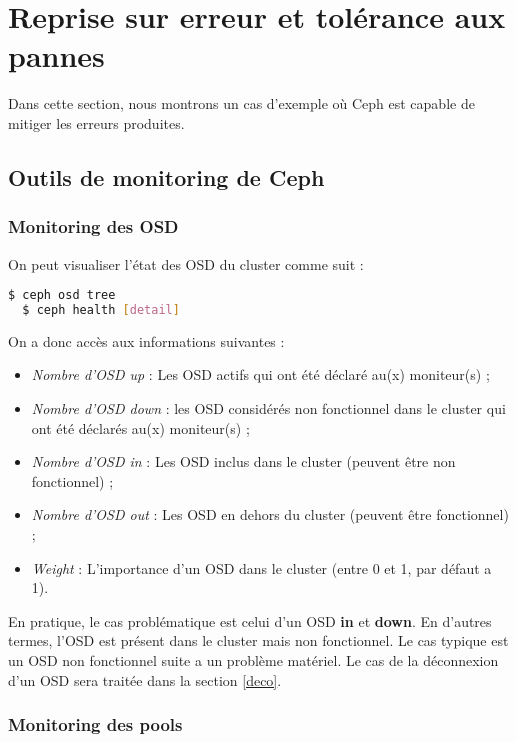 \section{Reprise sur erreur et tolérance aux pannes}

Dans cette section, nous montrons un cas d'exemple où Ceph est capable de mitiger les erreurs produites.

\subsection{Outils de monitoring de Ceph}

\subsubsection{Monitoring des OSD}

On peut visualiser l'état des OSD du cluster comme suit :
\vspace{3mm}
\begin{lstlisting}[language=bash]
  $ ceph osd tree
  $ ceph health [detail]
\end{lstlisting}

On a donc accès aux informations suivantes :

\begin{itemize}
    \item \textit{Nombre d'OSD up} : Les OSD actifs qui ont été déclaré au(x) moniteur(s) ;
    \item \textit{Nombre d'OSD down} : les OSD considérés non fonctionnel dans le cluster qui ont été déclarés au(x) moniteur(s) ;
     \item \textit{Nombre d'OSD in} : Les OSD inclus dans le cluster (peuvent être non fonctionnel) ;
     \item \textit{Nombre d'OSD out} : Les OSD en dehors du cluster (peuvent être fonctionnel) ;
     \item \textit{Weight} : L'importance d'un OSD dans le cluster (entre 0 et 1, par défaut a 1).
    \end{itemize}
    
    En pratique, le cas problématique est celui d'un OSD \textbf{in} et \textbf{down}. En d'autres termes, l'OSD est présent dans le cluster mais non fonctionnel. Le cas typique est un OSD non fonctionnel suite a un problème matériel. Le cas de la déconnexion d'un OSD sera traitée dans la section \ref{deco}.
    
\subsubsection{Monitoring des pools}

